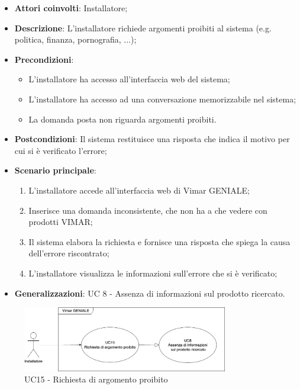 \begin{itemize}
    \item \textbf{Attori coinvolti}: Installatore;
    \item \textbf{Descrizione}: L’installatore richiede argomenti proibiti al sistema (e.g. politica, finanza, pornografia, ...);
    \item \textbf{Precondizioni}: 
        \begin{itemize}
            \item L’installatore ha accesso all’interfaccia web del sistema;
            \item L’installatore ha accesso ad una conversazione memorizzabile nel sistema;
            \item La domanda posta non riguarda argomenti proibiti.
        \end{itemize}
    \item \textbf{Postcondizioni}: Il sistema restituisce una risposta che indica il motivo per cui si è verificato l’errore;
    \item \textbf{Scenario principale}:
    \begin{enumerate}
    \item L’installatore accede all’interfaccia web di Vimar GENIALE;
    \item Inserisce una domanda inconsistente, che non ha a che vedere con prodotti VIMAR;
    \item Il sistema elabora la richiesta e fornisce una risposta che spiega la causa dell'errore riscontrato;
    \item L’installatore visualizza le informazioni sull’errore che si è verificato;
    \end{enumerate}
     \item \textbf{Generalizzazioni}: UC 8 - Assenza di informazioni sul prodotto ricercato.
\end{itemize}
\begin{figure}[H]
\centering
\includegraphics[width=0.8\textwidth]{contents/casi_duso/png/UC15.png}
\caption{UC15 - Richiesta di argomento proibito}
\end{figure}

